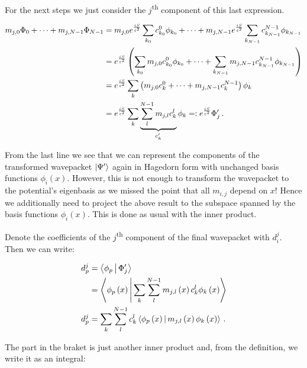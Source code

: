 For the next steps we just consider the $j$\textsuperscript{th} component of this last expression.

\begin{equation}
\begin{split}
  m_{j,0} \Phi_0 + \cdots + m_{j,N-1} \Phi_{N-1}
  & =
  m_{j,0} e^{\frac{iS}{\varepsilon^2}} \sum_{k_0} c_{k_0}^0 \phi_{k_0} + \cdots + m_{j,N-1} e^{\frac{iS}{\varepsilon^2}} \sum_{k_{N-1}} c_{k_{N-1}}^{N-1} \phi_{k_{N-1}} \\
  & =
  e^{\frac{iS}{\varepsilon^2}} \left( \sum_{k_0} m_{j,0} c_{k_0}^0 \phi_{k_0} + \cdots + \sum_{k_{N-1}} m_{j,N-1} c_{k_{N-1}}^{N-1} \phi_{k_{N-1}} \right) \\
  & =
  e^{\frac{iS}{\varepsilon^2}} \sum_{k} \left( m_{j,0} c_{k}^0 + \cdots + m_{j,N-1} c_{k}^{N-1} \right) \phi_{k} \\
  & =
  e^{\frac{iS}{\varepsilon^2}} \sum_{k} \underbrace{\sum_l^{N-1} m_{j,l} c_{k}^l}_{c_k^\prime} \phi_{k}
  =: e^{\frac{iS}{\varepsilon^2}} \Phi^{\prime}_j \,.
\end{split}
\end{equation}

From the last line we see that we can represent the components of the transformed
wavepacket $\Ket{\Psi^\prime}$ again in Hagedorn form with unchanged basis functions
$\phi_i\left(x\right)$. However, this is not enough to transform the wavepacket
to the potential's eigenbasis as we missed the point that all $m_{i,j}$ depend on $x$!
Hence we additionally need to project the above result to the subspace spanned by
the basis functions $\phi_i\left(x\right)$. This is done as usual with the inner
product.

Denote the coefficients of the $j$\textsuperscript{th} component of the final wavepacket
with $d_i^j$. Then we can write:

\begin{equation}
\begin{split}
  d_p^j & = \Braket{\phi_p | \Phi^{\prime}_j } \\
        & = \Braket{\phi_p\left(x\right) | \sum_k \sum_l^{N-1} m_{j,l}\left(x\right) c_k^l \phi_k\left(x\right)} \\
  d_p^j & = \sum_k \sum_l^{N-1} c_k^l \Braket{\phi_p\left(x\right) | m_{j,l}\left(x\right) \phi_k\left(x\right)} \,.
\end{split}
\end{equation}

The part in the braket is just another inner product and, from the definition, we
write it as an integral:

